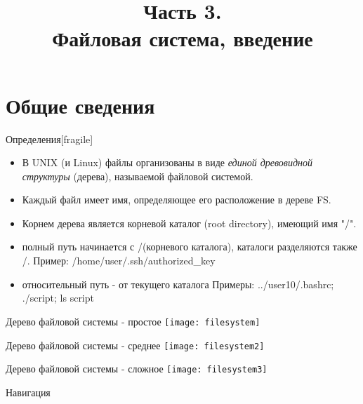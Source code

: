 


\title[SaM Solutions. Linux QA Training]
{
  Часть 3.\\
  Файловая система, введение
}


\begin{frame}
  \titlepage
\end{frame}

\section{Общие сведения}
\begin{frame}{Определения}[fragile]
  \begin{itemize}
    \item В UNIX (и Linux) файлы организованы в виде \emph{единой древовидной структуры} (дерева), называемой \alert{файловой системой}.
    \item \alert{Каждый файл имеет имя}, определяющее его расположение в дереве FS.
    \item Корнем дерева является \alert{корневой каталог} (root directory), имеющий имя \alert{"/"}.
  \end{itemize} \pause

  \begin{itemize}
    \item \alert{полный путь} начинается с \alert{/}(корневого каталога), каталоги разделяются также \alert{/}. \newline
      Пример: /home/user/.ssh/authorized\_key
    \item \alert{относительный путь} - от текущего каталога \newline
      Примеры: ../user10/.bashrc; ./script; ls script
  \end{itemize}

\end{frame}

\begin{frame}{Дерево файловой системы - простое}
\texttt{[image: filesystem]} 
\end{frame}

\begin{frame}{Дерево файловой системы - среднее}
\texttt{[image: filesystem2]} 
\end{frame}

\begin{frame}{Дерево файловой системы - сложное}
\texttt{[image: filesystem3]} 
\end{frame}

\begin{frame}{Навигация}
\end{frame}


